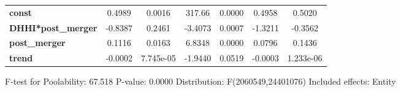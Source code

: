 \documentclass{report}
\begin{document}
\begin{center}
\begin{tabular}{lcccccc}
\midrule
\textbf{const}             &       0.4989       &       0.0016       &      317.66     &      0.0000      &       0.4958      &       0.5020       \\
\textbf{DHHI*post\_merger} &      -0.8387       &       0.2461       &     -3.4073     &      0.0007      &      -1.3211      &      -0.3562       \\
\textbf{post\_merger}      &       0.1116       &       0.0163       &      6.8348     &      0.0000      &       0.0796      &       0.1436       \\
\textbf{trend}             &      -0.0002       &     7.745e-05      &     -1.9440     &      0.0519      &      -0.0003      &     1.233e-06      \\
\bottomrule
\end{tabular}
\end{center}

F-test for Poolability: 67.518 \newline
 P-value: 0.0000 \newline
 Distribution: F(2060549,24401076) \newline
  \newline
 Included effects: Entity
\end{document}
